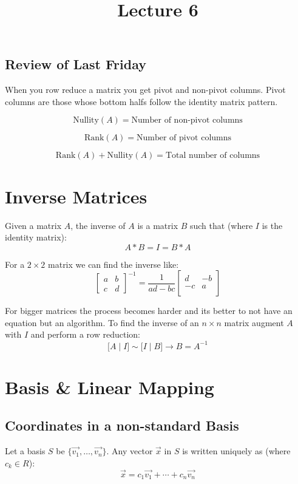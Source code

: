 \documentclass{article}
\title{Lecture 6}
\begin{document}
\maketitle

\subsection{Review of Last Friday}

When you row reduce a matrix you get pivot and non-pivot columns.
Pivot columns are those whose bottom halfs follow the identity matrix pattern.

$$
\text{Nullity}(A) = \text{Number of non-pivot columns}
$$

$$
\text{Rank}(A) = \text{Number of pivot columns}
$$

$$
\text{Rank}(A) + \text{Nullity}(A) = \text{Total number of columns}
$$

\section{Inverse Matrices}

Given a matrix $A$, the inverse of $A$ is a matrix $B$ such that (where $I$ is the identity matrix):
$$
A*B = I = B*A
$$

For a $2 \times 2$ matrix we can find the inverse like:
$$
\begin{bmatrix}
    a & b \\
    c & d
\end{bmatrix}^{-1} = \frac{1}{ad - bc} \begin{bmatrix}
    d & -b \\
    -c & a \\
\end{bmatrix}
$$

For bigger matrices the process becomes harder and its better to not have an equation but an algorithm.
To find the inverse of an $n \times n$ matrix augment $A$ with $I$ and perform a row reduction:
$$
\lbrack A \mid I \rbrack \sim \lbrack I \mid B \rbrack \to B = A^{-1}
$$

\section{Basis \& Linear Mapping}

\subsection{Coordinates in a non-standard Basis}
Let a basis $S$ be $\{ \vec{v_1}, \ldots, \vec{v_n} \}$. Any vector $\vec{x}$ in $S$ is written uniquely as (where $c_k \in R$):
$$
\vec{x} = c_1 \vec{v_1} + \cdots + c_n \vec{v_n}
$$
\end{document}
